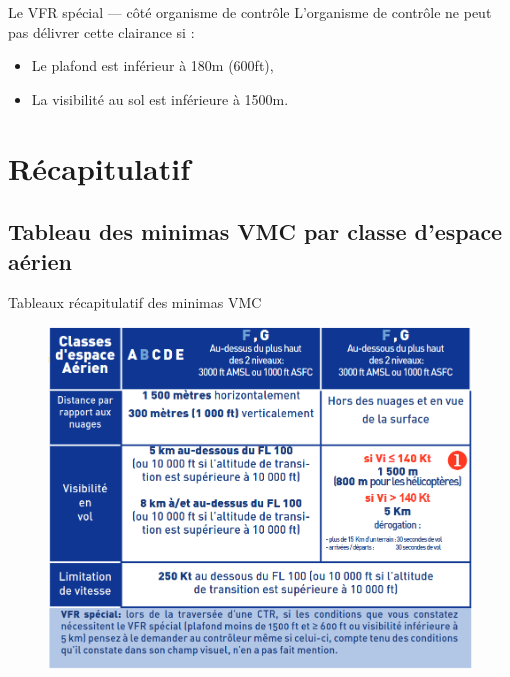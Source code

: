 \documentclass{beamer}
\begin{document}
\begin{frame}{Le VFR spécial — côté organisme de contrôle}
  L'organisme de contrôle ne peut pas délivrer cette clairance si :
  \pause
  
  \begin{itemize}
    \item Le plafond est inférieur à 180m (600ft), \pause
    \item La visibilité au sol est inférieure à 1500m.
  \end{itemize}

\end{frame}

\section{Récapitulatif}

\subsection{Tableau des minimas VMC par classe d'espace aérien}
\begin{frame}{Tableaux récapitulatif des minimas VMC}
  \begin{figure}
    \centering
    \includegraphics[scale=1]{images/conditions-vmc.png}
  \end{figure}
  
\end{frame}
\end{document}
